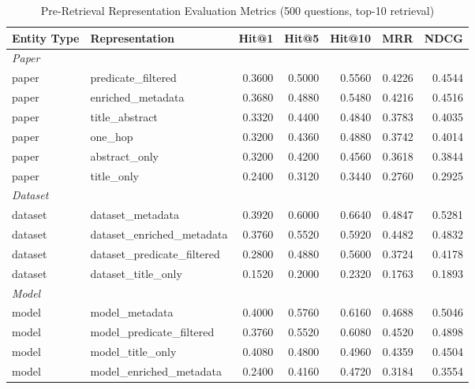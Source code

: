 \begin{table}[htbp]
  \centering
  \small
  \caption{Pre-Retrieval Representation Evaluation Metrics (500 questions, top-10 retrieval)}
  \label{tab:pre_retrieval_representation_metrics}
  \begin{tabular}{llrrrrr}
    \toprule
    \textbf{Entity Type} & \textbf{Representation} & \textbf{Hit@1} & \textbf{Hit@5} & \textbf{Hit@10} & \textbf{MRR} & \textbf{NDCG} \\
    \midrule
    \multicolumn{7}{l}{\textit{Paper}} \\
    paper & predicate\_filtered & 0.3600 & 0.5000 & 0.5560 & 0.4226 & 0.4544 \\
    paper & enriched\_metadata & 0.3680 & 0.4880 & 0.5480 & 0.4216 & 0.4516 \\
    paper & title\_abstract & 0.3320 & 0.4400 & 0.4840 & 0.3783 & 0.4035 \\
    paper & one\_hop & 0.3200 & 0.4360 & 0.4880 & 0.3742 & 0.4014 \\
    paper & abstract\_only & 0.3200 & 0.4200 & 0.4560 & 0.3618 & 0.3844 \\
    paper & title\_only & 0.2400 & 0.3120 & 0.3440 & 0.2760 & 0.2925 \\
    \midrule
    \multicolumn{7}{l}{\textit{Dataset}} \\
    dataset & dataset\_metadata & 0.3920 & 0.6000 & 0.6640 & 0.4847 & 0.5281 \\
    dataset & dataset\_enriched\_metadata & 0.3760 & 0.5520 & 0.5920 & 0.4482 & 0.4832 \\
    dataset & dataset\_predicate\_filtered & 0.2800 & 0.4880 & 0.5600 & 0.3724 & 0.4178 \\
    dataset & dataset\_title\_only & 0.1520 & 0.2000 & 0.2320 & 0.1763 & 0.1893 \\
    \midrule
    \multicolumn{7}{l}{\textit{Model}} \\
    model & model\_metadata & 0.4000 & 0.5760 & 0.6160 & 0.4688 & 0.5046 \\
    model & model\_predicate\_filtered & 0.3760 & 0.5520 & 0.6080 & 0.4520 & 0.4898 \\
    model & model\_title\_only & 0.4080 & 0.4800 & 0.4960 & 0.4359 & 0.4504 \\
    model & model\_enriched\_metadata & 0.2400 & 0.4160 & 0.4720 & 0.3184 & 0.3554 \\
    \bottomrule
  \end{tabular}
\end{table}
